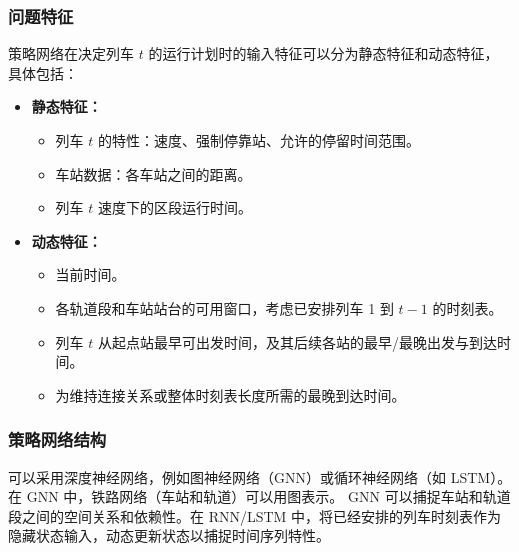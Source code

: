 \documentclass{article}
\begin{document}
\subsubsection{问题特征}
策略网络在决定列车 $t$ 的运行计划时的输入特征可以分为静态特征和动态特征，具体包括：
\begin{itemize}
    \item \textbf{静态特征：}
        \begin{itemize}
            \item 列车 $t$ 的特性：速度、强制停靠站、允许的停留时间范围。
            \item 车站数据：各车站之间的距离。
            \item 列车 $t$ 速度下的区段运行时间。
        \end{itemize}
    \item \textbf{动态特征：}
        \begin{itemize}
            \item 当前时间。
            \item 各轨道段和车站站台的可用窗口，考虑已安排列车 1 到 $t-1$ 的时刻表。
            \item 列车 $t$ 从起点站最早可出发时间，及其后续各站的最早/最晚出发与到达时间。
            \item 为维持连接关系或整体时刻表长度所需的最晚到达时间。
        \end{itemize}
\end{itemize}

\subsubsection{策略网络结构}
可以采用深度神经网络，例如图神经网络（GNN）或循环神经网络（如 LSTM）。在 GNN 中，铁路网络（车站和轨道）可以用图表示。
GNN 可以捕捉车站和轨道段之间的空间关系和依赖性。在 RNN/LSTM 中，将已经安排的列车时刻表作为隐藏状态输入，动态更新状态以捕捉时间序列特性。
\end{document}
